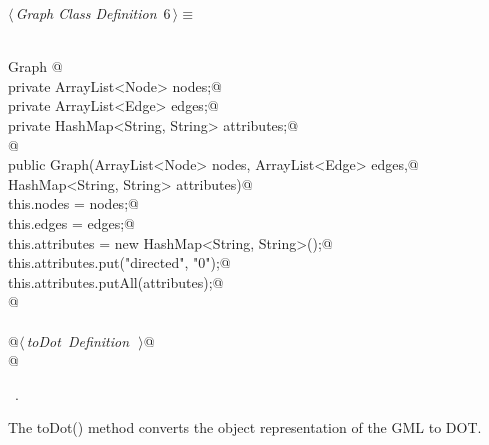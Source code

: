 \documentclass[a4paper]{report}
\begin{document}
\begin{flushleft} \small
\begin{minipage}{\linewidth}\label{scrap6}\raggedright\small
{} $\langle\,${\itshape Graph Class Definition}\nobreak\ {\footnotesize {6}}$\,\rangle\equiv$
\vspace{-1ex}
\begin{list}{}{} \item
\mbox{}\verb@@\\
\mbox{}\verb@class Graph {@\\
\mbox{}\verb@        private ArrayList<Node> nodes;@\\
\mbox{}\verb@        private ArrayList<Edge> edges;@\\
\mbox{}\verb@        private HashMap<String, String> attributes;@\\
\mbox{}\verb@        @\\
\mbox{}\verb@        public Graph(ArrayList<Node> nodes, ArrayList<Edge> edges,@\\
\mbox{}\verb@                 HashMap<String, String> attributes){@\\
\mbox{}\verb@                this.nodes = nodes;@\\
\mbox{}\verb@                this.edges = edges;@\\
\mbox{}\verb@                this.attributes = new HashMap<String, String>();@\\
\mbox{}\verb@                this.attributes.put("directed", "0");@\\
\mbox{}\verb@                this.attributes.putAll(attributes);@\\
\mbox{}\verb@        }@\\
\mbox{}\verb@@\\
\mbox{}\verb@        @\hbox{$\langle\,${\itshape toDot Definition}\nobreak\ {\footnotesize {}}$\,\rangle$}\verb@        @\\
\mbox{}\verb@}@\\
\mbox{}\verb@@{\NWsep}
\end{list}
\vspace{-1.5ex}
\footnotesize
\begin{list}{}{\setlength{\itemsep}{-\parsep}\setlength{\itemindent}{-\leftmargin}}
\item \NWtxtMacroRefIn\ .

\item{}
\end{list}
\end{minipage}\vspace{4ex}
\end{flushleft}
The toDot() method converts the object representation of the GML to DOT. 
\end{document}
